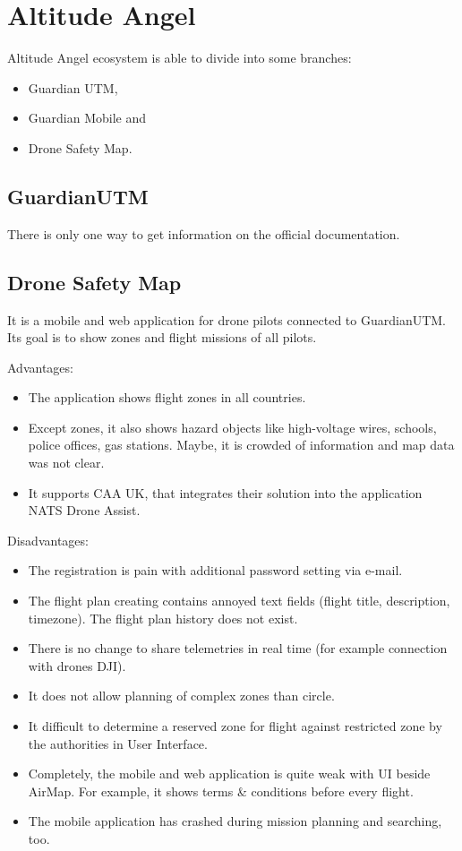 \section{Altitude Angel}\label{sec:altitude-angel}
Altitude Angel ecosystem is able to divide into some branches:
\begin{itemize}
    \item Guardian UTM,
    \item Guardian Mobile and
    \item Drone Safety Map.
\end{itemize}

\subsection{GuardianUTM}\label{subsec:guardianutm}
There is only one way to get information on the official documentation.\cite{altitudeAngel}


\subsection{Drone Safety Map}\label{subsec:drone-safety-map}
It is a mobile and web application for drone pilots connected to GuardianUTM. Its goal is to show zones and flight missions of all pilots.

Advantages:
\begin{itemize}
    \item The application shows flight zones in all countries.
    \item Except zones, it also shows hazard objects like high-voltage wires, schools, police offices, gas stations.
    Maybe, it is crowded of information and map data was not clear.
    \item It supports CAA UK, that integrates their solution into the application NATS Drone Assist.
\end{itemize}
Disadvantages:
\begin{itemize}
    \item The registration is pain with additional password setting via e-mail.
    \item The flight plan creating contains annoyed text fields (flight title, description, timezone).
    The flight plan history does not exist.
    \item There is no change to share telemetries in real time (for example connection with drones DJI).
    \item It does not allow planning of complex zones than circle.
    \item It difficult to determine a reserved zone for flight against restricted zone by the authorities in User Interface.
    \item Completely, the mobile and web application is quite weak with UI beside AirMap.
    For example, it shows terms \& conditions before every flight.
    \item The mobile application has crashed during mission planning and searching, too.
\end{itemize}
